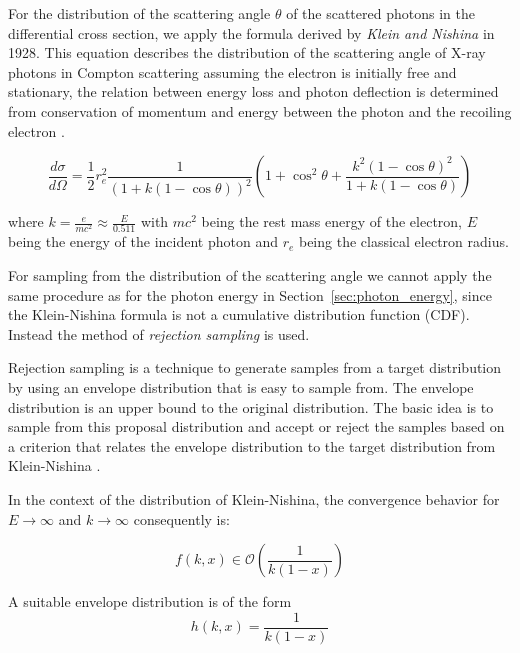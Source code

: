 For the distribution of the scattering angle $\theta$ of the scattered photons
in the differential cross section, we apply the formula derived by \emph{Klein
and Nishina} in 1928. This equation describes the distribution of the scattering
angle of X-ray photons in Compton scattering assuming the electron is initially
free and stationary, the relation between energy loss and photon deflection is
determined from conservation of momentum and energy between the photon and the
recoiling electron \cite{hubbell1969photon,klein1928scattering}.

\begin{equation}
    \label{eq:kleinNishina}
    \frac{d\sigma}{d\Omega} = \frac{1}{2} r_e^2 \frac{1}{(1 + k(1 - \cos \theta))^2} \left( 1 + \cos^2 \theta + \frac{k^2 (1 - \cos \theta)^2}{1+ k(1 - \cos \theta)} \right)
\end{equation}

where $k=\frac{e}{mc^2} \approx \frac{E}{0.511}$ with $mc^2$ being the rest mass
energy of the electron, $E$ being the energy of the incident photon and $r_e$
being the classical electron radius.

For sampling from the distribution of the scattering angle we cannot apply the
same procedure as for the photon energy in Section~\ref{sec:photon_energy},
since the Klein-Nishina formula is not a cumulative distribution function (CDF).
Instead the method of \emph{rejection sampling} is used. 

Rejection sampling is a technique to generate samples from a target distribution
by using an envelope distribution that is easy to sample from. The envelope
distribution is an upper bound to the original distribution. The basic idea is
to sample from this proposal distribution and accept or reject the samples based
on a criterion that relates the envelope distribution to the target distribution
from Klein-Nishina \cite[Chap. 4]{muller2012monte}.

In the context of the distribution of Klein-Nishina, the convergence behavior for $E\to\infty$ and $k\to\infty$ consequently is:

\begin{equation}
    f(k,x) \in \mathcal{O} (\frac{1}{k(1-x)})
\end{equation}

A suitable envelope distribution is of the form
\begin{equation*}
    h(k,x) = \frac{1}{k(1-x)}
\end{equation*}

